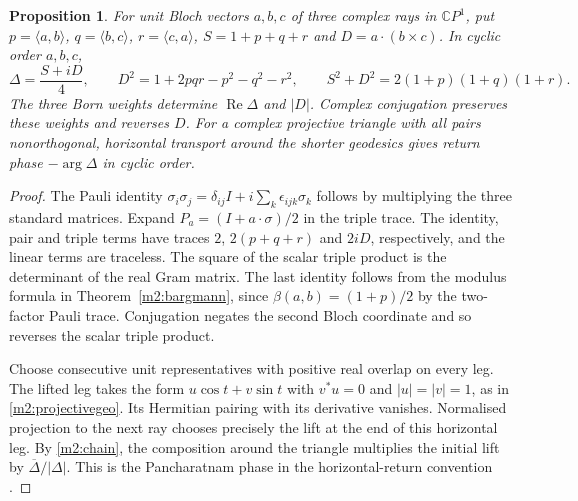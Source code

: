\documentclass[11pt,reqno]{amsart}
\newtheorem{proposition}[theorem]{Proposition}
\theoremstyle{definition}
\theoremstyle{remark}
\numberwithin{equation}{section}
\newcommand{\C}{\mathbb{C}}
\newcommand{\re}{\operatorname{Re}}
\newcommand{\ip}[2]{\langle #1,#2\rangle}
\begin{document}
\begin{proposition}\label{m2:bloch}
For unit Bloch vectors $a,b,c$ of three complex rays in $\C P^1$, put $p=\ip ab$, $q=\ip bc$, $r=\ip ca$, $S=1+p+q+r$ and
$D=a\cdot(b\times c)$.  In cyclic order $a,b,c$,
\begin{equation}\label{m2:bloch-cycle}
 \Delta=\frac{S+iD}{4},\qquad D^2=1+2pqr-p^2-q^2-r^2,\qquad S^2+D^2=2(1+p)(1+q)(1+r).
\end{equation}
The three Born weights determine $\re\Delta$ and $|D|$.  Complex conjugation preserves these weights and reverses $D$.  For a complex
projective triangle with all pairs nonorthogonal, horizontal transport around the shorter geodesics gives return phase $-\arg\Delta$ in
cyclic order.
\end{proposition}

\begin{proof}
The Pauli identity $\sigma_i\sigma_j=\delta_{ij}I+i\sum_k\epsilon_{ijk}\sigma_k$ follows by multiplying the three standard matrices.  Expand
$P_a=(I+a\cdot\sigma)/2$ in the triple trace.  The identity, pair and triple terms have traces $2$, $2(p+q+r)$ and $2iD$, respectively, and
the linear terms are traceless.  The square of the scalar triple product is the determinant of the real Gram matrix.  The last identity
follows from the modulus formula in Theorem~\ref{m2:bargmann}, since $\beta(a,b)=(1+p)/2$ by the two-factor Pauli trace.  Conjugation
negates the second Bloch coordinate and so reverses the scalar triple product.

Choose consecutive unit representatives with positive real overlap on every leg.  The lifted leg takes the form $u\cos t+v\sin t$ with
$v^*u=0$ and $|u|=|v|=1$, as in \eqref{m2:projectivegeo}.  Its Hermitian pairing with its derivative vanishes.  Normalised projection to the
next ray chooses precisely the lift at the end of this horizontal leg.  By \eqref{m2:chain}, the composition around the triangle multiplies
the initial lift by $\overline\Delta/|\Delta|$.  This is the Pancharatnam phase in the horizontal-return convention
\cite{m2:Pancharatnam,SB88,MS93}.
\end{proof}
\end{document}
